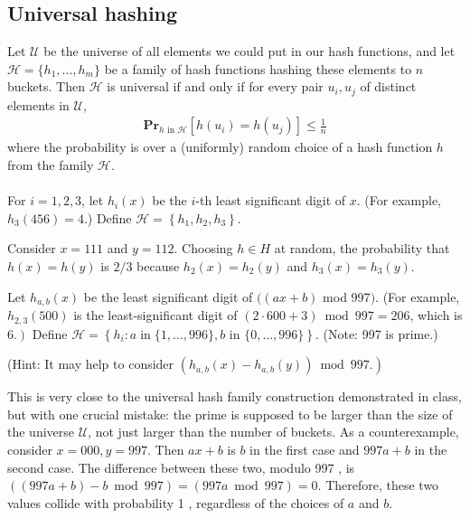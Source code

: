 \documentclass[12pt]{article}
\begin{document}
\subsection*{Universal hashing}
Let $\mathcal{U}$ be the universe of all elements we could put in our hash functions, and let $\mathcal{H} = \{h_1, ..., h_m\}$ be a family of hash functions hashing these elements to $n$ buckets. Then $\mathcal{H}$ is universal if and only if for every pair $u_i, u_j$ of distinct elements in $\mathcal{U}$,
\begin{align*}
    \textbf{Pr}_{h \text{ in } \mathcal{H}} [h(u_i) = h(u_j)]  \leq \frac{1}{n}
\end{align*}
where the probability is over a (uniformly) random choice of a hash function $h$ from the family $\mathcal{H}$.
\\\\
For $i=1,2,3$, let $h_{i}(x)$ be the $i$-th least significant digit of $x$. (For example, $h_{3}(456)=4$.) Define $\mathcal{H}=\left\{h_{1}, h_{2}, h_{3}\right\}$.
\begin{tcolorbox}
Consider $x=111$ and $y=112$. Choosing $h \in H$ at random, the probability that $h(x)=h(y)$ is $2 / 3$ because $h_{2}(x)=h_{2}(y)$ and $h_{3}(x)=h_{3}(y)$.  
\end{tcolorbox}

Let $h_{a, b}(x)$ be the least significant digit of $((a x+b)$ mod 997$)$. (For example, $h_{2,3}(500)$ is the least-significant digit of $(2 \cdot 600+3) \bmod 997=206$, which is $\left.6 .\right)$ Define $\mathcal{H}=\left\{h_{i}: a \operatorname{in}\{1, \ldots, 996\}, b\right.$ in $\left.\{0, \ldots, 996\}\right\}$. (Note: 997 is prime.)

(Hint: It may help to consider $\left.\left(h_{a, b}(x)-h_{a, b}(y)\right) \bmod 997 .\right)$
\begin{tcolorbox}
This is very close to the universal hash family construction demonstrated in class, but with one crucial mistake: the prime is supposed to be larger than the size of the universe $\mathcal{U}$, not just larger than the number of buckets. As a counterexample, consider $x=000, y=997$. Then $a x+b$ is $b$ in the first case and $997 a+b$ in the second case. The difference between these two, modulo 997 , is $((997 a+b)-b \bmod 997)=(997 a \bmod 997)=0$. Therefore, these two values collide with probability 1 , regardless of the choices of $a$ and $b$.
\end{tcolorbox}
\end{document}
